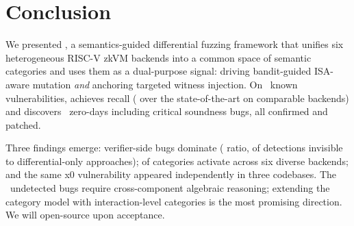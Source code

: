 \section{Conclusion}\label{sec:concl}

We presented \tool, a semantics-guided differential fuzzing framework that unifies six heterogeneous RISC-V zkVM backends into a common space of  semantic categories and uses them as a dual-purpose signal: driving bandit-guided ISA-aware mutation \emph{and} anchoring targeted witness injection. On ~known vulnerabilities, \tool achieves  recall (\tbd{$1.5\times$} over the state-of-the-art on comparable backends) and discovers ~zero-days including critical soundness bugs, all confirmed and patched.

Three findings emerge: verifier-side bugs dominate ( ratio,  of detections invisible to differential-only approaches);  of categories activate across six diverse backends; and the same x0 vulnerability appeared independently in three codebases. The ~undetected bugs require cross-component algebraic reasoning; extending the category model with interaction-level categories is the most promising direction. We will open-source \tool upon acceptance.
